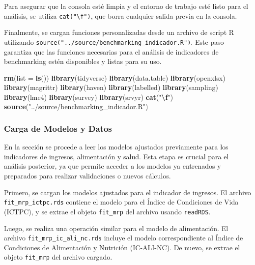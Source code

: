 \documentclass[
  12pt,
]{book}
\newenvironment{Shaded}{\begin{snugshade}}{\end{snugshade}}
\newcommand{\AttributeTok}[1]{\textcolor[rgb]{0.13,0.29,0.53}{#1}}
\newcommand{\FunctionTok}[1]{\textcolor[rgb]{0.13,0.29,0.53}{\textbf{#1}}}
\newcommand{\NormalTok}[1]{#1}
\newcommand{\SpecialCharTok}[1]{\textcolor[rgb]{0.81,0.36,0.00}{\textbf{#1}}}
\newcommand{\StringTok}[1]{\textcolor[rgb]{0.31,0.60,0.02}{#1}}
\begin{document}
Para asegurar que la consola esté limpia y el entorno de trabajo esté listo para el análisis, se utiliza \texttt{cat("\textbackslash{}f")}, que borra cualquier salida previa en la consola.

Finalmente, se cargan funciones personalizadas desde un archivo de script R utilizando \texttt{source("../source/benchmarking\_indicador.R")}. Este paso garantiza que las funciones necesarias para el análisis de indicadores de benchmarking estén disponibles y listas para su uso.

\begin{Shaded}
\begin{Highlighting}[]
\FunctionTok{rm}\NormalTok{(}\AttributeTok{list =} \FunctionTok{ls}\NormalTok{())}
\FunctionTok{library}\NormalTok{(tidyverse)}
\FunctionTok{library}\NormalTok{(data.table)}
\FunctionTok{library}\NormalTok{(openxlsx)}
\FunctionTok{library}\NormalTok{(magrittr)}
\FunctionTok{library}\NormalTok{(haven)}
\FunctionTok{library}\NormalTok{(labelled)}
\FunctionTok{library}\NormalTok{(sampling)}
\FunctionTok{library}\NormalTok{(lme4)}
\FunctionTok{library}\NormalTok{(survey)}
\FunctionTok{library}\NormalTok{(srvyr)}
\FunctionTok{cat}\NormalTok{(}\StringTok{"}\SpecialCharTok{\textbackslash{}f}\StringTok{"}\NormalTok{)}
\FunctionTok{source}\NormalTok{(}\StringTok{"../source/benchmarking\_indicador.R"}\NormalTok{)}
\end{Highlighting}
\end{Shaded}

\hypertarget{carga-de-modelos-y-datos}{%
\subsubsection*{Carga de Modelos y Datos}\label{carga-de-modelos-y-datos}}

En la sección se procede a leer los modelos ajustados previamente para los indicadores de ingresos, alimentación y salud. Esta etapa es crucial para el análisis posterior, ya que permite acceder a los modelos ya entrenados y preparados para realizar validaciones o nuevos cálculos.

Primero, se cargan los modelos ajustados para el indicador de ingresos. El archivo \texttt{fit\_mrp\_ictpc.rds} contiene el modelo para el Índice de Condiciones de Vida (ICTPC), y se extrae el objeto \texttt{fit\_mrp} del archivo usando \texttt{readRDS}.

Luego, se realiza una operación similar para el modelo de alimentación. El archivo \texttt{fit\_mrp\_ic\_ali\_nc.rds} incluye el modelo correspondiente al Índice de Condiciones de Alimentación y Nutrición (IC-ALI-NC). De nuevo, se extrae el objeto \texttt{fit\_mrp} del archivo cargado.
\end{document}

